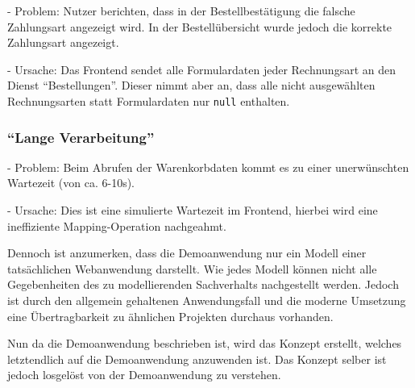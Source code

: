 - Problem: Nutzer berichten, dass in der Bestellbestätigung die falsche Zahlungsart angezeigt wird. In der Bestellübersicht wurde jedoch die korrekte Zahlungsart angezeigt.

- Ursache: Das Frontend sendet alle Formulardaten jeder Rechnungsart an den Dienst \enquote{Bestellungen}. Dieser nimmt aber an, dass alle nicht ausgewählten Rechnungsarten statt Formulardaten nur \texttt{null} enthalten.

\subsubsection{\enquote{Lange Verarbeitung}}

- Problem: Beim Abrufen der Warenkorbdaten kommt es zu einer unerwünschten Wartezeit (von ca. 6-10s).

- Ursache: Dies ist eine simulierte Wartezeit im Frontend, hierbei wird eine ineffiziente Mapping-Operation nachgeahmt.

%
%

Dennoch ist anzumerken, dass die Demoanwendung nur ein Modell einer tatsächlichen Webanwendung darstellt. Wie jedes Modell können nicht alle Gegebenheiten des zu modellierenden Sachverhalts nachgestellt werden. Jedoch ist durch den allgemein gehaltenen Anwendungsfall und die moderne Umsetzung eine Übertragbarkeit zu ähnlichen Projekten durchaus vorhanden.

Nun da die Demoanwendung beschrieben ist, wird das Konzept erstellt, welches letztendlich auf die Demoanwendung anzuwenden ist. Das Konzept selber ist jedoch losgelöst von der Demoanwendung zu verstehen.